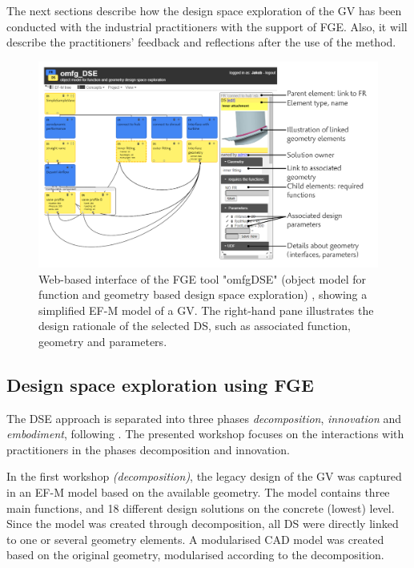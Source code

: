 \documentclass[aerospace,article,submit,moreauthors,pdftex]{Definitions/mdpi}
\begin{document}
The next sections describe how the design space exploration of the GV has been conducted with the industrial practitioners with the support of FGE. 
Also, it will describe the practitioners' feedback and reflections after the use of the method.

\begin{figure}[ht]
    \centering
    \includegraphics[width=\textwidth]{figures/pdf/interface.pdf}
    \caption{Web-based interface of the FGE tool "omfgDSE" (object model for function and geometry based design space exploration) , showing a simplified EF-M model of a GV.
    The right-hand pane illustrates the design rationale of the selected DS, such as associated function, geometry and parameters.}
    \label{fig:omfgDSEinterface}
\end{figure}

\subsection{Design space exploration using FGE}
The \ac{DSE} approach is separated into three phases \textit{decomposition}, \textit{innovation} and \textit{embodiment}, following \cite{Muller2019Aiedam}.
The presented workshop focuses on the interactions with practitioners in the phases decomposition and innovation.


In the first workshop \textit{(decomposition)}, the legacy design of the \ac{GV} was captured in an \ac{EF-M} model based on the available geometry.
The model contains three main functions, and 18 different design solutions on the concrete (lowest) level.
Since the model was created through decomposition, all \ac{DS} were directly linked to one or several geometry elements.
A modularised CAD model was created based on the original geometry, modularised according to the decomposition.
\end{document}
